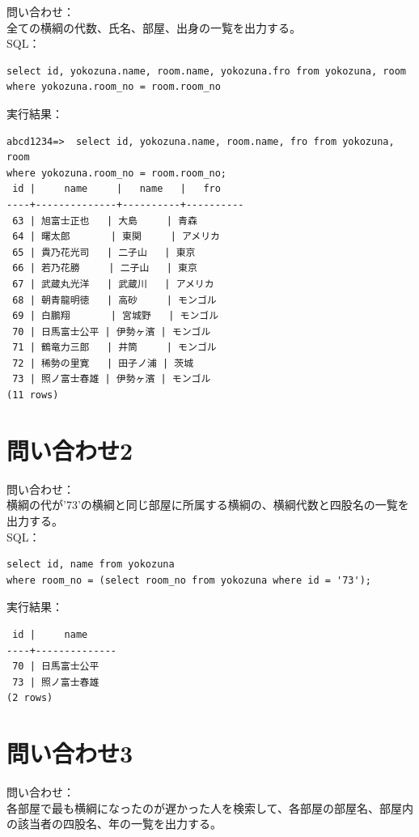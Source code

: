 \documentclass[10pt,a4paper,titlepage]{jreport}
\begin{document}
問い合わせ：\\
全ての横綱の代数、氏名、部屋、出身の一覧を出力する。\\

SQL：
\begin{verbatim}
select id, yokozuna.name, room.name, yokozuna.fro from yokozuna, room 
where yokozuna.room_no = room.room_no
\end{verbatim}
\vspace{3mm}

実行結果：
\begin{verbatim}
abcd1234=>  select id, yokozuna.name, room.name, fro from yokozuna, room
where yokozuna.room_no = room.room_no;
 id |     name     |   name   |   fro
----+--------------+----------+----------
 63 | 旭富士正也   | 大島     | 青森
 64 | 曙太郎       | 東関     | アメリカ
 65 | 貴乃花光司   | 二子山   | 東京
 66 | 若乃花勝     | 二子山   | 東京
 67 | 武蔵丸光洋   | 武蔵川   | アメリカ
 68 | 朝青龍明徳   | 高砂     | モンゴル
 69 | 白鵬翔       | 宮城野   | モンゴル
 70 | 日馬富士公平 | 伊勢ヶ濱 | モンゴル
 71 | 鶴竜力三郎   | 井筒     | モンゴル
 72 | 稀勢の里寛   | 田子ノ浦 | 茨城
 73 | 照ノ富士春雄 | 伊勢ヶ濱 | モンゴル
(11 rows)
\end{verbatim}


\section{問い合わせ2}

問い合わせ：\\
横綱の代が'73'の横綱と同じ部屋に所属する横綱の、横綱代数と四股名の一覧を出力する。\\

SQL：
\begin{verbatim}
select id, name from yokozuna
where room_no = (select room_no from yokozuna where id = '73');
\end{verbatim}
\vspace{3mm}

実行結果：
\begin{verbatim}
 id |     name
----+--------------
 70 | 日馬富士公平
 73 | 照ノ富士春雄
(2 rows)
\end{verbatim}


\section{問い合わせ3}

問い合わせ：\\
各部屋で最も横綱になったのが遅かった人を検索して、各部屋の部屋名、部屋内の該当者の四股名、年の一覧を出力する。\\
\end{document}
